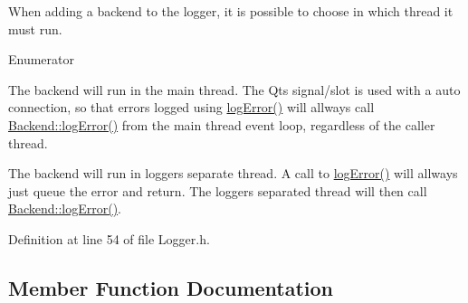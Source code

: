 When adding a backend to the logger, it is possible to choose in which thread it must run. \begin{Desc}
\item[Enumerator]\par
\begin{description}
\item[{\em 
Execute\+In\+Main\+Thread\hypertarget{class_mdt_1_1_error_logger_1_1_logger_ab6d6198b43b2bb94cede114ec67b781caac54433e68e1f766627c9fcc87f7b818}{}\label{class_mdt_1_1_error_logger_1_1_logger_ab6d6198b43b2bb94cede114ec67b781caac54433e68e1f766627c9fcc87f7b818}
}]The backend will run in the main thread. The Qt\textquotesingle{}s signal/slot is used with a auto connection, so that errors logged using \hyperlink{class_mdt_1_1_error_logger_1_1_logger_aa06a24a1d521258729ca172465b02040}{log\+Error()} will allways call \hyperlink{class_mdt_1_1_error_logger_1_1_backend_acf37cfc576269934ca8ce04e3601058d}{Backend\+::log\+Error()} from the main thread event loop, regardless of the caller thread. \item[{\em 
Execute\+In\+Separate\+Thread\hypertarget{class_mdt_1_1_error_logger_1_1_logger_ab6d6198b43b2bb94cede114ec67b781caf7dfdc36418cac0a65cea2cde2a11fd7}{}\label{class_mdt_1_1_error_logger_1_1_logger_ab6d6198b43b2bb94cede114ec67b781caf7dfdc36418cac0a65cea2cde2a11fd7}
}]The backend will run in logger\textquotesingle{}s separate thread. A call to \hyperlink{class_mdt_1_1_error_logger_1_1_logger_aa06a24a1d521258729ca172465b02040}{log\+Error()} will allways just queue the error and return. The logger\textquotesingle{}s separated thread will then call \hyperlink{class_mdt_1_1_error_logger_1_1_backend_acf37cfc576269934ca8ce04e3601058d}{Backend\+::log\+Error()}. \end{description}
\end{Desc}


Definition at line 54 of file Logger.\+h.



\subsection{Member Function Documentation}
